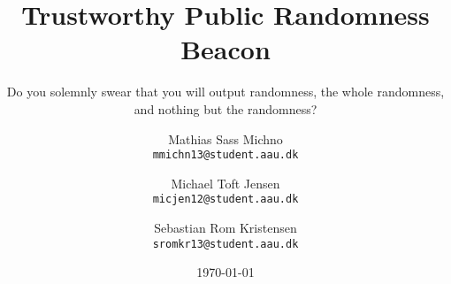\newcommand{\TITLE}{Trustworthy Public Randomness Beacon}
\newcommand{\SUBTITLE}{Do you solemnly swear that you will output randomness, the whole randomness, and nothing but the randomness?}
\newcommand{\GROUP}{deis1014f18}
\newcommand{\PERIOD}{Spring semester, 2018}
\newcommand{\MEMBERS}{%
    Mathias Sass Michno\\
    Michael Toft Jensen\\
    Sebastian Rom Kristensen
}
\newcommand{\SUPERVISOR}{René Rydhof Hansen\\Stefan Schmid}
\newcommand{\COMPLETION}{June 8, 2018}

\title{\TITLE}
\subtitle{\SUBTITLE}
\author{
    Mathias Sass Michno\\
    \texttt{mmichn13@student.aau.dk}
    \and
    Michael Toft Jensen\\
    \texttt{micjen12@student.aau.dk}
    \and
    Sebastian Rom Kristensen\\
    \texttt{sromkr13@student.aau.dk}
}
\date{\today}
